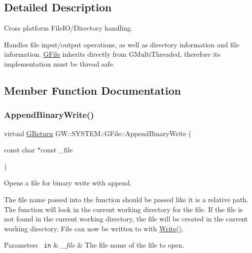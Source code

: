 \subsection{Detailed Description}
Cross platform File\+I\+O/\+Directory handling. 

Handles file input/output operations, as well as directory information and file information. \mbox{\hyperlink{classGW_1_1SYSTEM_1_1GFile}{G\+File}} inherits directly from G\+Multi\+Threaded, therefore its implementation must be thread safe. 

\subsection{Member Function Documentation}
\mbox{\label{classGW_1_1SYSTEM_1_1GFile_a63311236692181f99fd393fe8e1ca9fc}} 
\subsubsection{\texorpdfstring{AppendBinaryWrite()}{AppendBinaryWrite()}}
{\footnotesize\ttfamily virtual \mbox{\hyperlink{namespaceGW_a67a839e3df7ea8a5c5686613a7a3de21}{G\+Return}} G\+W\+::\+S\+Y\+S\+T\+E\+M\+::\+G\+File\+::\+Append\+Binary\+Write (\begin{DoxyParamCaption}\item[{const char $\ast$const}]{\+\_\+file }\end{DoxyParamCaption})\hspace{0.3cm}{\ttfamily [pure virtual]}}



Opens a file for binary write with append. 

The file name passed into the function should be passed like it is a relative path. The function will look in the current working directory for the file. If the file is not found in the current working directory, the file will be created in the current working directory. File can now be written to with \mbox{\hyperlink{classGW_1_1SYSTEM_1_1GFile_ae9906414c159e9f1156b5ff6ad511c31}{Write()}}.


\begin{DoxyParams}[1]{Parameters}
\mbox{\texttt{ in}}  & {\em \+\_\+file} & The file name of the file to open.\\
\hline
\end{DoxyParams}

